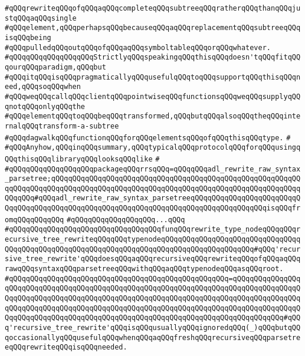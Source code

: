 \verb|#qQQqrewriteqQQqofqQQqaqQQqcompleteqQQqsubtreeqQQqratherqQQqthanqQQqjustqQQqaqQQqsingle|\newline
\verb|#qQQqelement,qQQqperhapsqQQqbecauseqQQqaqQQqreplacementqQQqsubtreeqQQqisqQQqbeing|\newline
\verb|#qQQqpulledqQQqoutqQQqofqQQqaqQQqsymboltableqQQqorqQQqwhatever.|\newline
\verb|#qQQqqQQqqQQqqQQqqQQqStrictlyqQQqspeakingqQQqthisqQQqdoesn'tqQQqfitqQQqourqQQqparadigm,qQQqbut|\newline
\verb|#qQQqitqQQqisqQQqpragmaticallyqQQqusefulqQQqtoqQQqsupportqQQqthisqQQqneed,qQQqsoqQQqwhen|\newline
\verb|#qQQqweqQQqcallqQQqclientqQQqpointwiseqQQqfunctionsqQQqweqQQqsupplyqQQqnotqQQqonlyqQQqthe|\newline
\verb|#qQQqelementqQQqtoqQQqbeqQQqtransformed,qQQqbutqQQqalsoqQQqtheqQQqinternalqQQqtransform-a-subtree|\newline
\verb|#qQQqdagwalkqQQqfunctionqQQqforqQQqelementsqQQqofqQQqthisqQQqtype.|\newline
\verb|#|\newline
\verb|#qQQqAnyhow,qQQqinqQQqsummary,qQQqtypicalqQQqprotocolqQQqforqQQqusingqQQqthisqQQqlibraryqQQqlooksqQQqlike|\newline
\verb|#|\newline
\verb|#qQQqqQQqqQQqqQQqqQQqpackageqQQqrrsqQQq=qQQqqQQqadl_rewrite_raw_syntax_parsetree;qQQqqQQqqQQqqQQqqQQqqQQqqQQqqQQqqQQqqQQqqQQqqQQqqQQqqQQqqQQqqQQqqQQqqQQqqQQqqQQqqQQqqQQqqQQqqQQqqQQqqQQqqQQqqQQqqQQqqQQqqQQqqQQqqQQqqQQq#qQQqadl_rewrite_raw_syntax_parsetreeqQQqqQQqqQQqqQQqqQQqqQQqqQQqqQQqqQQqqQQqqQQqqQQqqQQqqQQqqQQqqQQqqQQqqQQqqQQqqQQqqQQqqQQqisqQQqfromqQQqqQQqqQQq|\newline
\verb|#qQQqqQQqqQQqqQQqqQQq...qQQq|\newline
\verb|#qQQqqQQqqQQqqQQqqQQqqQQqqQQqqQQqqQQqfunqQQqrewrite_type_nodeqQQqqQQqrecursive_tree_rewriteqQQqqQQqtypenodeqQQqqQQqqQQqqQQqqQQqqQQqqQQqqQQqqQQqqQQqqQQqqQQqqQQqqQQqqQQqqQQqqQQqqQQqqQQqqQQqqQQqqQQqqQQq#qQQq'recursive_tree_rewrite'qQQqdoesqQQqaqQQqrecursiveqQQqrewriteqQQqofqQQqaqQQqrawqQQqsyntaxqQQqparsetreeqQQqwithqQQqaqQQqtypenodeqQQqasqQQqroot.|\newline
\verb|#qQQqqQQqqQQqqQQqqQQqqQQqqQQqqQQqqQQqqQQqqQQqqQQqqQQq=qQQqqQQqqQQqqQQqqQQqqQQqqQQqqQQqqQQqqQQqqQQqqQQqqQQqqQQqqQQqqQQqqQQqqQQqqQQqqQQqqQQqqQQqqQQqqQQqqQQqqQQqqQQqqQQqqQQqqQQqqQQqqQQqqQQqqQQqqQQqqQQqqQQqqQQqqQQqqQQqqQQqqQQqqQQqqQQqqQQqqQQqqQQqqQQqqQQqqQQqqQQqqQQqqQQqqQQqqQQqqQQqqQQqqQQqqQQqqQQqqQQqqQQqqQQqqQQqqQQqqQQqqQQqqQQqqQQqqQQqqQQqqQQqqQQq#qQQq'recursive_tree_rewrite'qQQqisqQQqusuallyqQQqignoredqQQq(_)qQQqbutqQQqoccasionallyqQQqusefulqQQqwhenqQQqaqQQqfreshqQQqrecursiveqQQqparsetreeqQQqrewriteqQQqisqQQqneeded.|\newline
